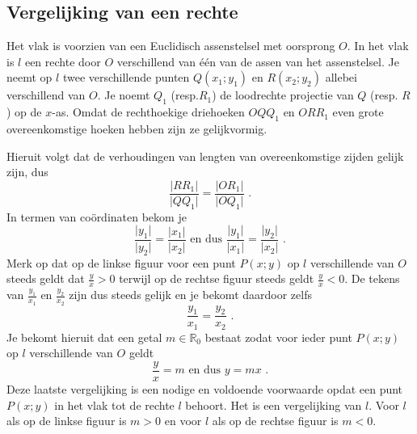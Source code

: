 \subsection{Vergelijking van een rechte}


Het vlak is voorzien van een Euclidisch assenstelsel met oorsprong $O$.
In het vlak is $l$ een rechte door $O$ verschillend van \'e\'en van de assen van het assenstelsel.
Je neemt op $l$ twee verschillende punten $Q(x_1;y_1)$ en $R(x_2;y_2)$ allebei verschillend van $O$.
Je noemt $Q_1$ (resp.$R_1$) de loodrechte projectie van $Q$ (resp. $R$) op de $x$-as.
Omdat de rechthoekige driehoeken $OQQ_1$ en $ORR_1$ even grote overeenkomstige hoeken hebben zijn ze gelijkvormig.


\begin{minipage}{.5\linewidth}
\begin{center}
	
\end{center}
\end{minipage}
\begin{minipage}{.5\linewidth}
\begin{center}
	
\end{center}
\end{minipage}



Hieruit volgt dat de verhoudingen van lengten van overeenkomstige zijden gelijk zijn, dus
\[
\frac {\vert RR_1 \vert}{\vert QQ_1 \vert}=\frac {\vert OR_1 \vert}{\vert OQ_1 \vert} \text { .}
\]
In termen van co\"ordinaten bekom je
\[
\frac {\vert y_1 \vert}{\vert y_2 \vert}=\frac {\vert x_1 \vert}{\vert x_2 \vert} \text { en dus } \frac {\vert y_1 \vert}{\vert x_1 \vert}=\frac {\vert y_2 \vert}{\vert x_2 \vert} \text { .}
\]
Merk op dat op de linkse figuur voor een punt $P(x;y)$ op $l$ verschillende van $O$ steeds geldt dat $\frac {y}{x}>0$ terwijl op de rechtse figuur steeds geldt $\frac {y}{x}<0$.
De tekens van $\frac {y_1}{x_1}$ en $\frac {y_2}{x_2}$ zijn dus steeds gelijk en je bekomt daardoor zelfs
\[
\frac {y_1}{x_1} = \frac{y_2}{x_2} \text { .}
\]
Je bekomt hieruit dat een getal $m \in \mathbb{R}_0$ bestaat zodat voor ieder punt $P(x;y)$ op $l$ verschillende van $O$ geldt
\[
\frac {y}{x}=m \text { en dus } y=mx \text { .}
\]
Deze laatste vergelijking is een nodige en voldoende voorwaarde opdat een punt $P(x;y)$ in het vlak tot de rechte $l$ behoort.
Het is een vergelijking van $l$.
Voor $l$ als op de linkse figuur is $m>0$ en voor $l$ als op de rechtse figuur is $m<0$.

